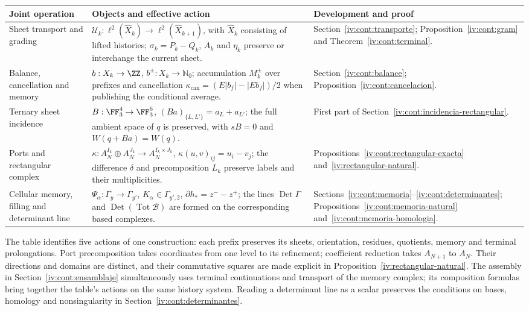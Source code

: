 \begin{center}
\small
\begin{tabular}{@{}p{.21\linewidth}p{.48\linewidth}p{.23\linewidth}@{}}
\toprule
Joint operation & Objects and effective action & Development and proof\\
\midrule
Sheet transport and grading
& \(\mathcal U_k:\ell^2(\widehat X_k)\to
\ell^2(\widehat X_{k+1})\), with \(\widehat X_k\) consisting of
lifted histories; \(\sigma_k=P_k-Q_k\), \(A_k\) and
\(\eta_k\) preserve or interchange the current sheet.
& Section~\ref{iv:cont:transporte}; Proposition~\ref{iv:cont:gram}
and Theorem~\ref{iv:cont:terminal}.\\[5pt]
Balance, cancellation and memory
& \(b:X_k\to\ZZ\), \(b^\pm:X_k\to\mathbb N_0\);
accumulation \(M_k^\pm\) over prefixes and cancellation
\(\kappa_{\mathrm{can}}=(E|b_f|-|Eb_f|)/2\) when publishing
the conditional average.
& Section~\ref{iv:cont:balance};
Proposition~\ref{iv:cont:cancelacion}.\\[5pt]
Ternary sheet incidence
& \(B:\FF_3^4\to\FF_3^6\),
\((Ba)_{\{L,L'\}}=a_L+a_{L'}\); the full ambient space
of \(q\) is preserved, with \(sB=0\) and \(W(q+Ba)=W(q)\).
& First part of
Section~\ref{iv:cont:incidencia-rectangular}.\\[5pt]
Ports and rectangular complex
& \(\kappa:A_N^{I_k}\oplus A_N^{J_k}\to
A_N^{I_k\times J_k}\), \(\kappa(u,v)_{ij}=u_i-v_j\);
the difference \(\delta\) and precomposition \(L_k\)
preserve labels and their multiplicities.
& Propositions~\ref{iv:cont:rectangular-exacta}
and~\ref{iv:rectangular-natural}.\\[5pt]
Cellular memory, filling and determinant line
& \(\Psi_\alpha:\Gamma_y\to\Gamma_{y'}\),
\(K_\alpha\in\Gamma_{y',2}\),
\(\partial h_*=z^--z^+\); the lines
\(\operatorname{Det}\Gamma\) and
\(\operatorname{Det}(\operatorname{Tot}\mathcal B)\)
are formed on the corresponding based complexes.
& Sections~\ref{iv:cont:memoria}--\ref{iv:cont:determinantes};
Propositions~\ref{iv:cont:memoria-natural}
and~\ref{iv:cont:memoria-homologia}.\\
\bottomrule
\end{tabular}
\end{center}

The table identifies five actions of one construction: each
prefix preserves its sheets, orientation, residues, quotients, memory
and terminal prolongations. Port precomposition takes
coordinates from one level to its refinement; coefficient reduction
takes \(A_{N+1}\) to \(A_N\). Their directions and domains are
distinct, and their commutative squares are made explicit in
Proposition~\ref{iv:rectangular-natural}. The assembly in
Section~\ref{iv:cont:ensamblaje} simultaneously uses
terminal continuations and transport of the memory complex;
its composition formulas bring together the table's actions on the
same history system. Reading a determinant line
as a scalar preserves the conditions on bases, homology and
nonsingularity in Section~\ref{iv:cont:determinantes}.

